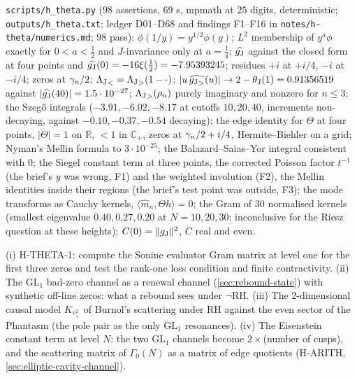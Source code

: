 \begin{numerical}
\label{num:h-theta}
\texttt{scripts/h\_theta.py} ($98$ assertions, $69$ s, mpmath at $25$ digits, deterministic; \texttt{outputs/h\_theta.txt};
ledger D01--D68 and findings F1--F16 in \texttt{notes/h-theta/numerics.md}; $98$ pass): $\phi(1/y) = y^{1/2}\phi(y)$;
$L^2$ membership of $y^a\phi$ exactly for $0<a<\tfrac12$ and $J$-invariance only at $a = \tfrac14$; $\widehat{g_{\mathrm J}}$ against
the closed form at four points and $\widehat{g_{\mathrm J}}(0) = -16\xi(\tfrac12) = -7.95393245$; residues $+i$ at $+i/4$, $-i$ at
$-i/4$; zeros at $\gamma_{n}/2$; ${\Lambda_{\mathrm J}}_{<} = {\Lambda_{\mathrm J}}_{>}(1-\cdot)$; $|u\,\widehat{{g_{\mathrm J}}_{>}}(u)|\to2-\theta_{\mathrm J}(1) = 0.91356519$
against $|\widehat{g_{\mathrm J}}(40)| = 1.5\cdot10^{-27}$; ${\Lambda_{\mathrm J}}_{>}(\rho_n)$ purely imaginary and nonzero for $n\le3$; the
Szeg\H o integrals ($-3.91,-6.02,-8.17$ at cutoffs $10,20,40$, increments non-decaying, against $-0.10,-0.37,-0.54$
decaying); the edge identity for $\Theta$ at four points, $|\Theta| = 1$ on $\mathbb R$, $<1$ in $\mathbb C_+$, zeros at
$\gamma_{n}/2+i/4$, Hermite--Biehler on a grid; Nyman's Mellin formula to $3\cdot10^{-25}$; the Balazard--Saias--Yor
integral consistent with $0$; the Siegel constant term at three points, the corrected Poisson factor $t^{-1}$ (the
brief's $y$ was wrong, F1) and the weighted involution (F2), the Mellin identities inside their regions (the
brief's test point was outside, F3); the mode transforms as Cauchy kernels, $\langle\widehat m_n,\Theta h\rangle = 0$; the
Gram of $30$ normalised kernels (smallest eigenvalue $0.40, 0.27, 0.20$ at $N = 10,20,30$; inconclusive for the
Riesz question at these heights); $C(0) = \|g_{\mathrm J}\|^2$, $C$ real and even.
\end{numerical}

\begin{observation}
\label{obs:h-theta-next}
(i) H-THETA-1: compute the Sonine evaluator Gram matrix at level one for the first three zeros and test the rank-one
loss condition and finite contractivity. (ii) The GL$_1$ bad-zero channel as a renewal channel (\cref{sec:rebound-state})
with synthetic off-line zeros: what a rebound sees under $\neg$RH. (iii) The $2$-dimensional causal model $K_{v_+^2}$
of Burnol's scattering under RH against the even sector of the Phantasm (the pole pair as the only GL$_1$ resonances).
(iv) The Eisenstein constant term at level $N$: the two GL$_1$ channels become $2\times$(number of cusps), and the
scattering matrix of $\Gamma_0(N)$ as a matrix of edge quotients (H-ARITH, \cref{sec:elliptic-cavity-channel}).
\end{observation}
